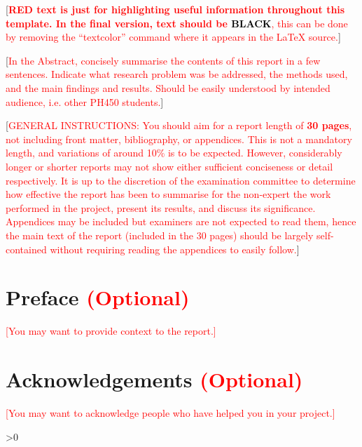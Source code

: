 \documentclass[aps,pra,a4paper,nofootinbib,onecolumn,tightenlines,longbibliography,12pt,amsfonts,amssymb,amsmath,floatfix]{revtex4-2} %
\begin{document}
	[\textcolor{red}{\textbf{RED text is just for highlighting useful information throughout this template. In the final version, text should be \textcolor{black}{BLACK}}, this can be done by removing the ``textcolor'' command where it appears in the LaTeX source.}]
	
	[\textcolor{red}{In the Abstract, concisely summarise the contents of this report in a few sentences. Indicate what research problem was be addressed, the methods used, and the main findings and results. Should be easily understood by intended audience, i.e. other PH450 students.}]
	
	[\textcolor{red}{GENERAL INSTRUCTIONS: You should aim for a report length of \textbf{30 pages}, not including front matter, bibliography, or appendices. This is not a mandatory length, and variations of around 10\% is to be expected. However, considerably longer or shorter reports may not show either sufficient conciseness or detail respectively. It is up to the discretion of the examination committee to determine how effective the report has been to summarise for the non-expert the work performed in the project, present its results, and discuss its significance. Appendices may be included but examiners are not expected to read them, hence the main text of the report (included in the 30 pages) should be largely self-contained without requiring reading the appendices to easily follow.}]

\newpage
\section*{Preface \textcolor{red}{(Optional)}}

\textcolor{red}{[You may want to provide context to the report.]}

\newpage
\section*{Acknowledgements \textcolor{red}{(Optional)}}

\textcolor{red}{[You may want to acknowledge people who have helped you in your project.]}

\newpage
\tableofcontents %
\makeatletter
\let\toc@pre\relax
\let\toc@post\relax
\makeatother

\ifnum\totalfigures>0
\newpage
\listoffigures
{}
\fi
\end{document}

